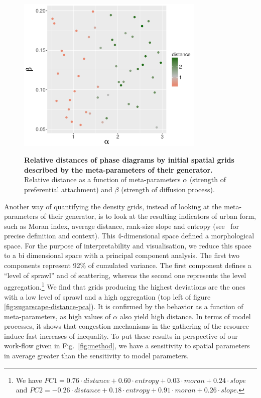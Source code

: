 \documentclass[Royal,sageh,times]{sagej}
\begin{document}
\begin{figure}
\centering
\includegraphics[width=0.8\textwidth]{figures/relativedistance_metaparams}\\
\caption{\textbf{Relative distances of phase diagrams by initial spatial grids described by the meta-parameters of their generator.} Relative distance as a function of meta-parameters $\alpha$ (strength of preferential attachment) and $\beta$ (strength of diffusion process).}
\label{fig:sugarscape-distance-meta}
\end{figure}

Another way of quantifying the density grids, instead of looking at the meta-parameters of their generator, is to look at the resulting indicators of urban form, such as Moran index, average distance, rank-size slope and entropy (see~\cite{LeNechet2015} for precise definition and context). This 4-dimensional space defined a morphological space. For the purpose of interpretability and visualisation, we reduce this space to a bi dimensional space with a principal component analysis. The first two components represent 92\% of cumulated variance. The first component defines a ``level of sprawl'' and of scattering, whereas the second one represents the level aggregation.\footnote{We have $PC1 = 0.76\cdot distance + 0.60\cdot entropy + 0.03\cdot moran + 0.24\cdot slope$ and $PC2 = -0.26\cdot distance + 0.18\cdot entropy + 0.91\cdot moran + 0.26\cdot slope$.} We find that grids producing the highest deviations are the ones with a low level of sprawl and a high aggregation (top left of figure \ref{fig:sugarscape-distance-pca}). It is confirmed by the behavior as a function of meta-parameters, as high values of $\alpha$ also yield high distance. In terms of model processes, it shows that congestion mechanisms in the gathering of the resource induce fast increases of inequality. To put these results in perspective of our work-flow given in Fig.~\ref{fig:method}, we have a sensitivity to spatial parameters in average greater than the sensitivity to model parameters.
\end{document}
